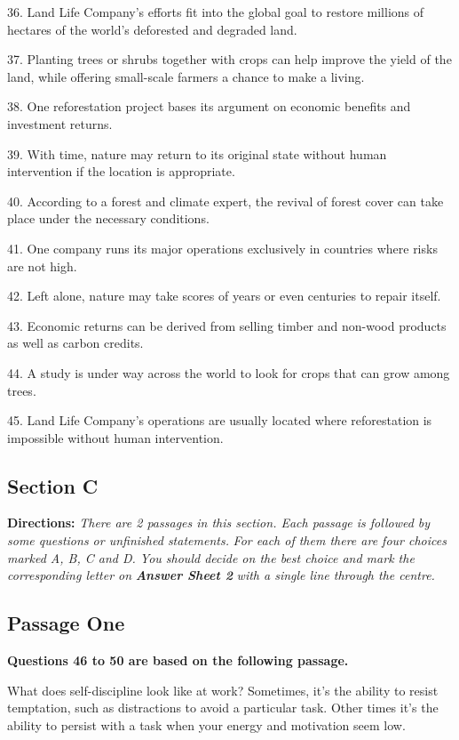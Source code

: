 \documentclass[UTF8,11pt]{ctexart}
\begin{document}
36. Land Life Company’s efforts fit into the global goal to restore millions of hectares of the world’s deforested and degraded land.


37. Planting trees or shrubs together with crops can help improve the yield of the land, while offering small-scale farmers a chance to make a living.


38. One reforestation project bases its argument on economic benefits and investment returns.


39. With time, nature may return to its original state without human intervention if the location is appropriate.


40. According to a forest and climate expert, the revival of forest cover can take place under the necessary conditions.


41. One company runs its major operations exclusively in countries where risks are not high.


42. Left alone, nature may take scores of years or even centuries to repair itself.


43. Economic returns can be derived from selling timber and non-wood products as well as carbon credits.


44. A study is under way across the world to look for crops that can grow among trees.


45. Land Life Company’s operations are usually located where reforestation is impossible without human intervention.


\subsection*{\textbf{Section C}}


\textbf{Directions: }\textit{There are 2 passages in this section. Each passage is followed by some questions or unfinished statements.} \textit{For each of them there are four choices marked A, B, C and D. You should decide on the best choice and mark the} \textit{corresponding letter on }\textbf{\textit{Answer Sheet 2}}\textit{ with a single line through the centre.}


\subsection*{\textbf{Passage One}}


\textbf{Questions 46 to 50 are based on the following passage.}


What does self-discipline look like at work? Sometimes, it’s the ability to resist temptation, such as distractions to avoid a particular task. Other times it’s the ability to persist with a task when your energy and motivation seem low.
\end{document}
